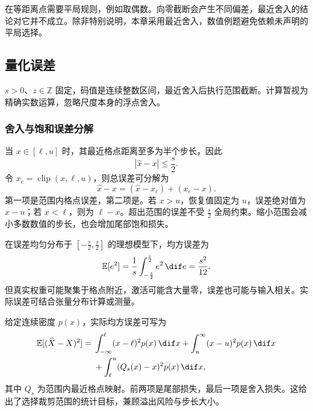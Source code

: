 \documentclass[../textbook.tex]{subfiles}
\begin{document}
在等距离点需要平局规则，例如取偶数。向零截断会产生不同偏差，最近舍入的结论对它并不成立。除非特别说明，本章采用最近舍入，数值例题避免依赖未声明的平局选择。

\subsection{量化误差}

\begin{assumption}[均匀量化的误差边界]
$s>0$、$z\in\mathbb Z$ 固定，码值是连续整数区间，最近舍入后执行范围截断。计算暂视为精确实数运算，忽略尺度本身的浮点舍入。
\end{assumption}

\subsubsection{舍入与饱和误差分解}
当 $x\in[\ell,u]$ 时，其最近格点距离至多为半个步长，因此
\begin{equation}
|\widehat x-x|\le \frac{s}{2}.
\label{eq:opt-round-bound}
\end{equation}
令 $x_c=\operatorname{clip}(x,\ell,u)$，则总误差可分解为
\begin{equation}
\widehat x-x=(\widehat x-x_c)+(x_c-x).
\end{equation}
第一项是范围内格点误差，第二项是。若 $x>u$，恢复值固定为 $u$，误差绝对值为 $x-u$；若 $x<\ell$，则为 $\ell-x$。超出范围的误差不受 $\frac{s}{2}$ 全局约束。缩小范围会减小多数数值的步长，也会增加尾部饱和损失。

在误差均匀分布于 $[-\frac{s}{2},\frac{s}{2}]$ 的理想模型下，均方误差为
\begin{equation}
\mathbb E[e^2]=\frac1s\int_{-\frac{s}{2}}^{\frac{s}{2}}e^2\,\dif e=\frac{s^2}{12}.
\end{equation}
但真实权重可能聚集于格点附近，激活可能含大量零，误差也可能与输入相关。实际误差可结合张量分布计算或测量。

给定连续密度 $p(x)$，实际均方误差可写为
\begin{align}
\mathbb E[(\widehat X-X)^2]
={}&\int_{-\infty}^{\ell}(x-\ell)^2p(x)\,\dif x
+\int_u^{\infty}(x-u)^2p(x)\,\dif x\\
&+\int_{\ell}^{u}(Q_s(x)-x)^2p(x)\,\dif x,
\label{eq:opt-mse}
\end{align}
其中 $Q_s$ 为范围内最近格点映射。前两项是尾部损失，最后一项是舍入损失。这给出了选择裁剪范围的统计目标，兼顾溢出风险与步长大小。
\end{document}
